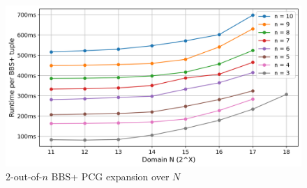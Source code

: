 \begin{figure}[t]
    \centering
    \includegraphics[scale=0.49]{images/plots/bbs_pcg_TAUoutofN.png}
    \caption{$2$-out-of-$n$ BBS+ PCG expansion over $N$}
    \label{fig:BBStauoutofn}
\end{figure}

